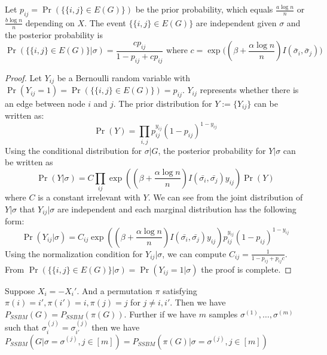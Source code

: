 \documentclass{article}
\begin{document}
\begin{lemma}\label{lem:post_independent}
	Let $p_{ij}=\Pr(\{\{i,j\} \in E(G) \})$ be the prior probability, which equals $\frac{a\log n}{n}$ or $\frac{b\log n}{n}$ depending on $X$.
	The event $\{\{i,j\} \in E(G) \}$ are independent given $\sigma$ and the posterior probability is
	\begin{equation}
	\Pr(\{\{i,j\} \in E(G) \} | \sigma) = \frac{c p_{ij} }{1-p_{ij} + cp_{ij}} \text{ where  } c= \exp\Big((\beta + \frac{\alpha \log n}{n} ) I(\bar{\sigma}_i, \bar{\sigma}_j) \Big)
	\end{equation}
\end{lemma}
\begin{proof}
	Let $Y_{ij}$ be a Bernoulli random variable with $\Pr(Y_{ij} = 1) = \Pr(\{\{i,j\} \in E(G)\}) = p_{ij}$. $Y_{ij}$ represents whether there is an edge between node $i$ and $j$.
	The prior distribution for $Y:=\{Y_{ij}\}$ can be written as:
	$$
	\Pr(Y) = \prod_{i,j} p_{ij}^{y_{ij}} (1-p_{ij})^{1-y_{ij}}
	$$ 
	Using the conditional distribution for $\sigma|G$, the posterior probability for $Y| \sigma$ can be written as
	$$
	\Pr(Y|\sigma) = C\prod_{ij} \exp((\beta + \frac{\alpha \log n}{n})I(\bar{\sigma_i}, \bar{\sigma_j} )y_{ij}) \Pr(Y)
	$$
	where $C$ is a constant irrelevant with $Y$.
	We can see from the joint distribution of $Y|\sigma$ that $Y_{ij} | \sigma$ are independent and each marginal distribution has the following form:
	$$
	\Pr(Y_{ij} | \sigma) = C_{ij} \exp((\beta + \frac{\alpha \log n}{n})I(\bar{\sigma_i}, \bar{\sigma_j} )y_{ij}) p_{ij}^{y_{ij}} (1-p_{ij})^{1-y_{ij}}
	$$
	Using the normalization condition for $Y_{ij} | \sigma $, we can compute $C_{ij} = \frac{1}{1-p_{ij} + p_{ij}c}$. From $\Pr(\{\{i,j\} \in E(G) \} | \sigma) =\Pr(Y_{ij}=1|\sigma)$ the proof is complete.
\end{proof}
\begin{lemma}\label{lem:xpi}
	Suppose $X_i = - X_i'$. And a permutation $\pi$ satisfying $\pi(i) = i', \pi(i') = i, \pi(j) = j$ for $j\neq i, i'$.
    Then we have $P_{SSBM}(G) = P_{SSBM}(\pi(G))$. Further if we have $m$ samples $\sigma^{(1)}, \dots, \sigma^{(m)}$ such that $\sigma^{(j)}_i = \sigma^{(j)}_{i'}$ then we have
    $P_{SSBM}(G | \sigma=\sigma^{(j)},j\in[m]) = P_{SSBM}(\pi(G) | \sigma=\sigma^{(j)},j\in[m])$
\end{lemma}
\end{document}
